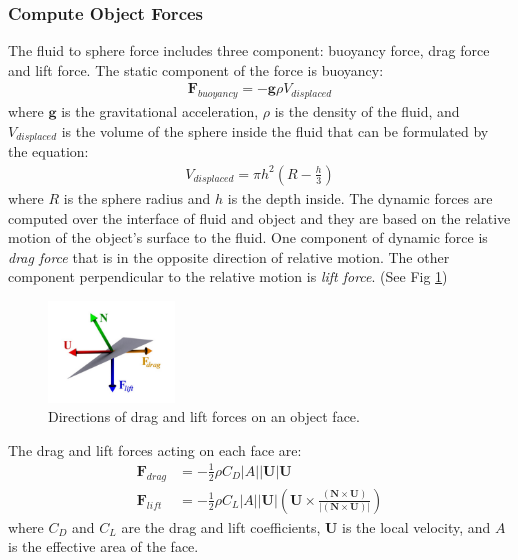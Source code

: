 \documentclass[acmtog]{acmart}
\begin{document}
\subsubsection{Compute Object Forces}
 The fluid to sphere force includes three component: buoyancy force, drag force and lift force.
 The static component of the force is buoyancy:
 \begin{equation*}
   \begin{aligned}
        \mathbf{F}_{buoyancy} = -\mathbf{g}\rho V_{displaced}
    \end{aligned}
\end{equation*}
where $\mathbf{g}$ is the gravitational acceleration, $\rho$ is the density of the fluid, and $V_{displaced}$ is the volume of the sphere inside the fluid that can be formulated by the equation:
 \begin{equation*}
   \begin{aligned}
        V_{displaced} = \pi h^2\left(R-\frac{h}{3}\right)
    \end{aligned}
\end{equation*}
where $R$ is the sphere radius and $h$ is the depth inside.
The dynamic forces are computed over the interface of fluid and object and they are based on the relative motion of the object's surface to the fluid. One component of dynamic force is \textit{drag force} that is in the opposite direction of relative motion. The other component perpendicular to the relative motion is \textit{lift force}. (See Fig \ref{fig:2})
\begin{figure}[!htb]
  \centering
  \includegraphics[width=0.3\textwidth]{image/force.png}
  \caption{Directions of drag and lift forces on an object face.} 
\label{fig:2}
\end{figure}
The drag and lift forces acting on each face are:
 \begin{equation*}
   \begin{aligned}
        \mathbf{F}_{drag} &= -\frac{1}{2}\rho C_{D}|A||\mathbf{U}|\mathbf{U} \\
        \mathbf{F}_{lift} &= -\frac{1}{2}\rho C_{L}|A||\mathbf{U}|\left(\mathbf{U} \times \frac{(\mathbf{N} \times \mathbf{U})}{|(\mathbf{N} \times \mathbf{U})|}\right)
    \end{aligned}
\end{equation*}
where $C_D$ and $C_L$ are the drag and lift coefficients, $\mathbf{U}$ is the local velocity, and $A$ is the effective area of the face. 
\end{document}
